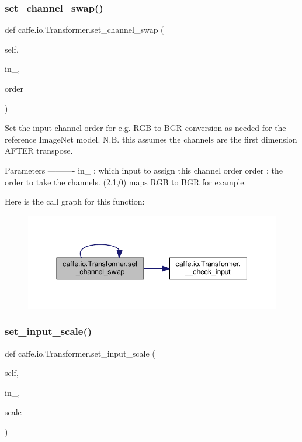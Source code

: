 \subsubsection{\texorpdfstring{set\+\_\+channel\+\_\+swap()}{set\_channel\_swap()}\hspace{0.1cm}{\footnotesize\ttfamily [2/2]}}
{\footnotesize\ttfamily def caffe.\+io.\+Transformer.\+set\+\_\+channel\+\_\+swap (\begin{DoxyParamCaption}\item[{}]{self,  }\item[{}]{in\+\_\+,  }\item[{}]{order }\end{DoxyParamCaption})}

\begin{DoxyVerb}Set the input channel order for e.g. RGB to BGR conversion
as needed for the reference ImageNet model.
N.B. this assumes the channels are the first dimension AFTER transpose.

Parameters
----------
in_ : which input to assign this channel order
order : the order to take the channels.
    (2,1,0) maps RGB to BGR for example.
\end{DoxyVerb}
 Here is the call graph for this function\+:
\nopagebreak
\begin{figure}[H]
\begin{center}
\leavevmode
\includegraphics[width=344pt]{classcaffe_1_1io_1_1_transformer_abd32a70aebb66e66de7567800547b114_cgraph}
\end{center}
\end{figure}
\mbox{\label{classcaffe_1_1io_1_1_transformer_ab3d72541298e2fb73a884df37e56f65c}} 
\subsubsection{\texorpdfstring{set\+\_\+input\+\_\+scale()}{set\_input\_scale()}\hspace{0.1cm}{\footnotesize\ttfamily [1/2]}}
{\footnotesize\ttfamily def caffe.\+io.\+Transformer.\+set\+\_\+input\+\_\+scale (\begin{DoxyParamCaption}\item[{}]{self,  }\item[{}]{in\+\_\+,  }\item[{}]{scale }\end{DoxyParamCaption})}

